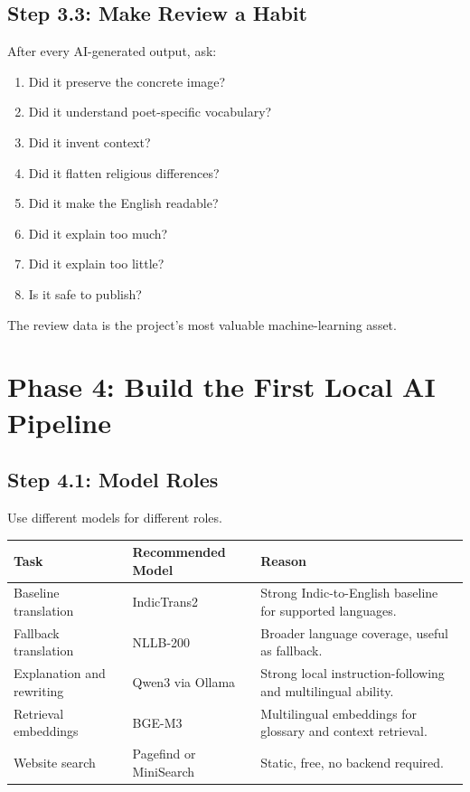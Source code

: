 \documentclass[11pt]{article}
\begin{document}
\subsection{Step 3.3: Make Review a Habit}

After every AI-generated output, ask:

\begin{enumerate}
  \item Did it preserve the concrete image?
  \item Did it understand poet-specific vocabulary?
  \item Did it invent context?
  \item Did it flatten religious differences?
  \item Did it make the English readable?
  \item Did it explain too much?
  \item Did it explain too little?
  \item Is it safe to publish?
\end{enumerate}

The review data is the project's most valuable machine-learning asset.

\section{Phase 4: Build the First Local AI Pipeline}

\subsection{Step 4.1: Model Roles}

Use different models for different roles.

\begin{longtable}{>{\raggedright\arraybackslash}p{}
                  >{\raggedright\arraybackslash}p{}
                  >{\raggedright\arraybackslash}p{}}
\textbf{Task} & \textbf{Recommended Model} & \textbf{Reason} \\
\hline
Baseline translation & IndicTrans2 & Strong Indic-to-English baseline for supported languages. \\
Fallback translation & NLLB-200 & Broader language coverage, useful as fallback. \\
Explanation and rewriting & Qwen3 via Ollama & Strong local instruction-following and multilingual ability. \\
Retrieval embeddings & BGE-M3 & Multilingual embeddings for glossary and context retrieval. \\
Website search & Pagefind or MiniSearch & Static, free, no backend required. \\
\end{longtable}
\end{document}
